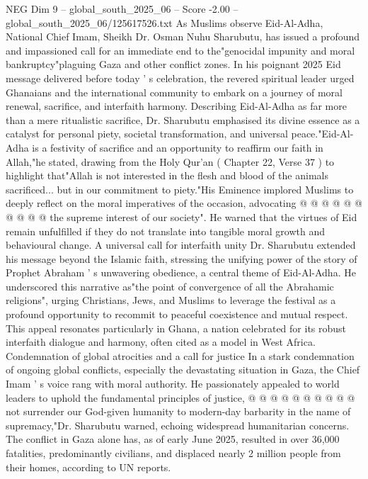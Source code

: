 \begin{textsample}{NEG Dim 9 – global\_south\_2025\_06 – Score -2.00 – global\_south\_2025\_06/125617526.txt}  \label{ex:f9_neg_283}
As Muslims observe Eid-Al-Adha, National Chief Imam, Sheikh Dr.
Osman Nuhu Sharubutu, has issued a profound and impassioned call for an immediate end to the"genocidal impunity and moral bankruptcy"plaguing Gaza and other conflict zones.
In his poignant 2025 Eid message delivered before today ' s celebration, the revered spiritual leader urged Ghanaians and the international community to embark on a journey of moral renewal, sacrifice, and interfaith harmony.
Describing Eid-Al-Adha as far more than a mere ritualistic sacrifice, Dr.
Sharubutu emphasised its divine essence as a catalyst for personal piety, societal transformation, and universal peace."Eid-Al-Adha is a festivity of sacrifice and an opportunity to reaffirm our faith in Allah,"he stated, drawing from the Holy Qur'an ( Chapter 22, Verse 37 ) to highlight that"Allah is not interested in the flesh and blood of the animals sacrificed... but in our commitment to piety."His Eminence implored Muslims to deeply reflect on the moral imperatives of the occasion, advocating @ @ @ @ @ @ @ @ @ @ the supreme interest of our society".
He warned that the virtues of Eid remain unfulfilled if they do not translate into tangible moral growth and behavioural change.
A universal call for interfaith unity Dr.
Sharubutu extended his message beyond the Islamic faith, stressing the unifying power of the story of Prophet Abraham ' s unwavering obedience, a central theme of Eid-Al-Adha.
He underscored this narrative as"the point of convergence of all the Abrahamic religions", urging Christians, Jews, and Muslims to leverage the festival as a profound opportunity to recommit to peaceful coexistence and mutual respect.
This appeal resonates particularly in Ghana, a nation celebrated for its robust interfaith dialogue and harmony, often cited as a model in West Africa.
Condemnation of global atrocities and a call for justice In a stark condemnation of ongoing global conflicts, especially the devastating situation in Gaza, the Chief Imam ' s voice rang with moral authority.
He passionately appealed to world leaders to uphold the fundamental principles of justice, @ @ @ @ @ @ @ @ @ @ not surrender our God-given humanity to modern-day barbarity in the name of supremacy,"Dr.
Sharubutu warned, echoing widespread humanitarian concerns.
The conflict in Gaza alone has, as of early June 2025, resulted in over 36,000 fatalities, predominantly civilians, and displaced nearly 2 million people from their homes, according to UN reports.

\end{textsample}

